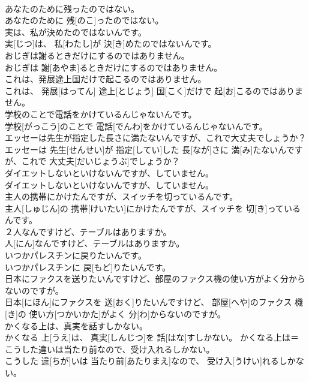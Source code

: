 \documentclass[8pt]{extreport}
\begin{document}
\begin{CJK}{UTF8}{min}
\\	あなたのために残ったのではない。	
\\	あなたのために 残[のこ]ったのではない。	
\\	実は、私が決めたのではないんです。	
\\	実[じつ]は、 私[わたし]が 決[き]めたのではないんです。	
\\	おじぎは謝るときだけにするのではありません。	
\\	おじぎは 謝[あやま]るときだけにするのではありません。	
\\	これは、発展途上国だけで起こるのではありません。	
\\	これは、 発展[はってん] 途上[とじょう] 国[こく]だけで 起[お]こるのではありません。	
\\	学校のことで電話をかけているんじゃないんです。	
\\	学校[がっこう]のことで 電話[でんわ]をかけているんじゃないんです。	
\\	エッセーは先生が指定した長さに満たないんですが、これで大丈夫でしょうか？	
\\	エッセーは 先生[せんせい]が 指定[してい]した 長[なが]さに 満[み]たないんですが、これで 大丈夫[だいじょうぶ]でしょうか？	
\\	ダイエットしないといけないんですが、していません。	
\\	ダイエットしないといけないんですが、していません。	
\\	主人の携帯にかけたんですが、スイッチを切っているんです。	
\\	主人[しゅじん]の 携帯[けいたい]にかけたんですが、スイッチを 切[き]っているんです。	
\\	２人なんですけど、テーブルはありますか。	
\\	人[にん]なんですけど、テーブルはありますか。	
\\	いつかパレスチンに戻りたいんです。	
\\	いつかパレスチンに 戻[もど]りたいんです。	
\\	日本にファクスを送りたいんですけど、部屋のファクス機の使い方がよく分からないのですが。	
\\	日本[にほん]にファクスを 送[おく]りたいんですけど、 部屋[へや]のファクス 機[き]の 使い方[つかいかた]がよく 分[わ]からないのですが。	
\\	かくなる上は、真実を話すしかない。	
\\	かくなる 上[うえ]は、 真実[しんじつ]を 話[はな]すしかない。	かくなる上は＝ 
\\	こうした違いは当たり前なので、受け入れるしかない。	
\\	こうした 違[ちが]いは 当たり前[あたりまえ]なので、 受け入[うけい]れるしかない。	

\end{CJK}
\end{document}
